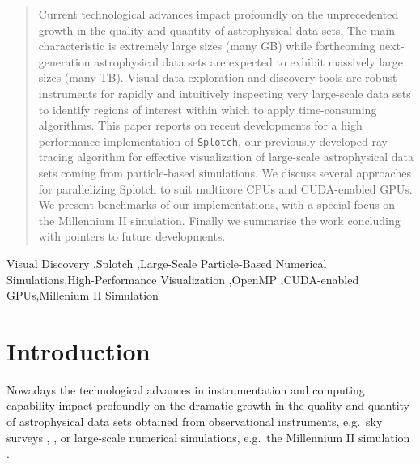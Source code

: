 \documentclass[1p,times]{elsarticle}
\begin{document}
\begin{frontmatter}
\begin{abstract}
Current technological advances impact profoundly on the unprecedented growth 
in the quality and quantity of astrophysical data sets. The main characteristic
is extremely large sizes (many GB) while forthcoming next-generation astrophysical
data sets are expected to exhibit massively large sizes (many TB). Visual data
exploration and discovery tools are robust instruments for rapidly and intuitively 
inspecting very large-scale data sets to identify regions of interest within
which to apply time-consuming algorithms.  This paper reports on recent developments 
for a high performance implementation of {\tt Splotch}, our previously developed 
ray-tracing algorithm for effective visualization of large-scale astrophysical 
data sets coming from particle-based simulations. We discuss several approaches for
parallelizing Splotch to suit multicore CPUs and CUDA-enabled GPUs. 
We present benchmarks of our implementations, with a special focus on the 
Millennium II simulation. Finally we summarise the work concluding with pointers 
to future developments.

\end{abstract}

\begin{keyword}


Visual Discovery \sep Splotch \sep Large-Scale Particle-Based Numerical Simulations\sep High-Performance Visualization \sep OpenMP \sep CUDA-enabled GPUs\sep Millenium II Simulation 




\end{keyword}

\end{frontmatter}


\section{Introduction}
\label{intro}

Nowadays the technological advances in instrumentation and computing 
capability impact profoundly on the dramatic growth in the quality and 
quantity of astrophysical data sets obtained from observational instruments,
e.g.\ sky surveys \cite{sdss}, \cite{lofar}, or large-scale numerical
simulations, e.g.\ the Millennium II simulation \cite{2009MNRAS.398.1150B}.
\end{document}
